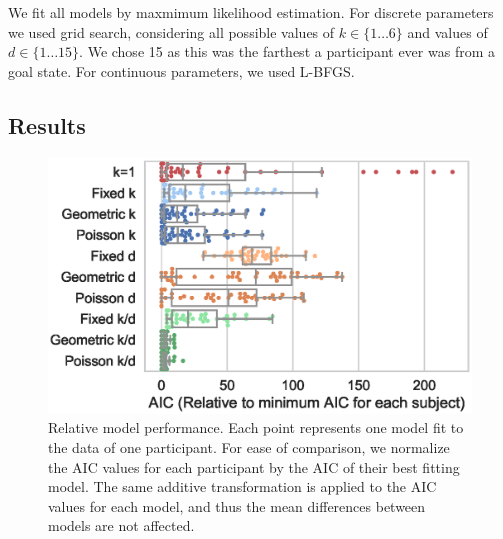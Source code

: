 \documentclass[10pt,letterpaper]{article}
\begin{document}
We fit all models by maxmimum likelihood estimation. For discrete parameters we used grid search, considering all possible values of $k \in \{ 1 \dots 6 \}$ and values of $d \in \{1 \dots 15 \}$. We chose 15 as this was the farthest a participant ever was from a goal state. For continuous parameters, we used L-BFGS.


\subsection{Results}

\begin{figure}[t!]
  \centering
  \includegraphics[scale=0.55]{model-fits}
  \caption{Relative model performance. Each point represents one model fit to the data of one participant. For ease of comparison, we normalize the AIC values for each participant by the AIC of their best fitting model. The same additive transformation is applied to the AIC values for each model, and thus the mean differences between models are not affected.} 
  \label{fig:model-fits}
\end{figure}
\end{document}
